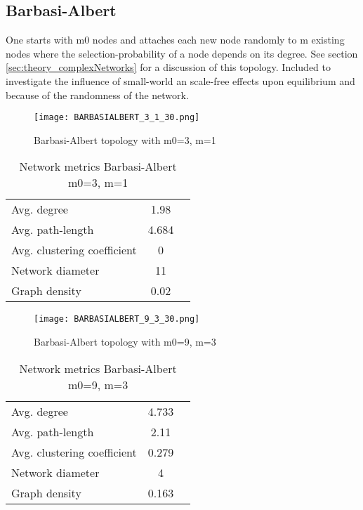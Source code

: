 \documentclass[Bachelorarbeit.tex]{subfiles}
\begin{document}
\subsection{Barbasi-Albert}
One starts with m0 nodes and attaches each new node randomly to m existing nodes where the selection-probability of a node depends on its degree. See section \ref{sec:theory_complexNetworks} for a discussion of this topology.
\medskip
Included to investigate the influence of small-world an scale-free effects upon equilibrium and because of the randomness of the network.

\begin{figure}[H]
	\centering
  \texttt{[image: BARBASIALBERT\_3\_1\_30.png]}
	\caption{Barbasi-Albert topology with m0=3, m=1}
	\label{fig:topology_BARBASIALBERT_3_1_30}
\end{figure}

\begin{table}[h]
	\centering
	\caption{Network metrics Barbasi-Albert m0=3, m=1}
	\begin{tabular} { l c r }
		\hline
		Avg. degree & 1.98 \\
		Avg. path-length & 4.684 \\
		Avg. clustering coefficient & 0 \\
		Network diameter & 11 \\
		Graph density & 0.02 \\
		\hline
	\end{tabular}
\end{table}

\begin{figure}[H]
	\centering
  \texttt{[image: BARBASIALBERT\_9\_3\_30.png]}
	\caption{Barbasi-Albert topology with m0=9, m=3}
	\label{fig:topology_BARBASIALBERT_9_3_30}
\end{figure}

\begin{table}[h]
	\centering
	\caption{Network metrics Barbasi-Albert m0=9, m=3}
	\begin{tabular} { l c r }
		\hline
		Avg. degree & 4.733 \\
		Avg. path-length & 2.11 \\
		Avg. clustering coefficient & 0.279 \\
		Network diameter & 4 \\
		Graph density & 0.163 \\
		\hline
	\end{tabular}
\end{table}
\end{document}
